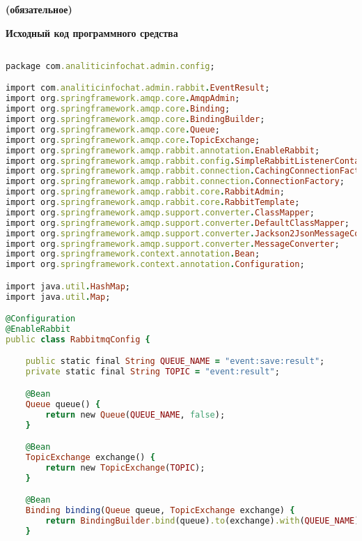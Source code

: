 

\begin{center}
\vspace{-1em}
\textbf{ (обязательное)}

\textbf{Исходный код программного средства}
\end{center}


  \begin{lstlisting}[language=Ruby, style=rubystyle]

package com.analiticinfochat.admin.config;

import com.analiticinfochat.admin.rabbit.EventResult;
import org.springframework.amqp.core.AmqpAdmin;
import org.springframework.amqp.core.Binding;
import org.springframework.amqp.core.BindingBuilder;
import org.springframework.amqp.core.Queue;
import org.springframework.amqp.core.TopicExchange;
import org.springframework.amqp.rabbit.annotation.EnableRabbit;
import org.springframework.amqp.rabbit.config.SimpleRabbitListenerContainerFactory;
import org.springframework.amqp.rabbit.connection.CachingConnectionFactory;
import org.springframework.amqp.rabbit.connection.ConnectionFactory;
import org.springframework.amqp.rabbit.core.RabbitAdmin;
import org.springframework.amqp.rabbit.core.RabbitTemplate;
import org.springframework.amqp.support.converter.ClassMapper;
import org.springframework.amqp.support.converter.DefaultClassMapper;
import org.springframework.amqp.support.converter.Jackson2JsonMessageConverter;
import org.springframework.amqp.support.converter.MessageConverter;
import org.springframework.context.annotation.Bean;
import org.springframework.context.annotation.Configuration;

import java.util.HashMap;
import java.util.Map;

@Configuration
@EnableRabbit
public class RabbitmqConfig {

    public static final String QUEUE_NAME = "event:save:result";
    private static final String TOPIC = "event:result";

    @Bean
    Queue queue() {
        return new Queue(QUEUE_NAME, false);
    }

    @Bean
    TopicExchange exchange() {
        return new TopicExchange(TOPIC);
    }

    @Bean
    Binding binding(Queue queue, TopicExchange exchange) {
        return BindingBuilder.bind(queue).to(exchange).with(QUEUE_NAME);
    }


\end{lstlisting}
